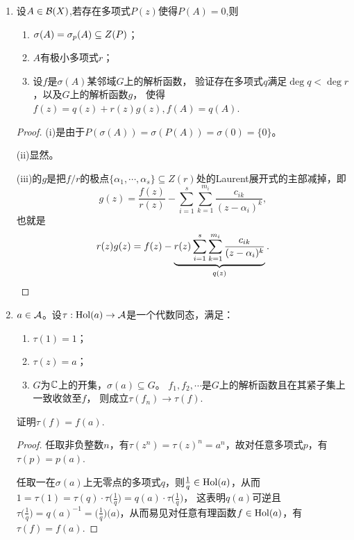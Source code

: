 \begin{enumerate}
\begin{proof}
        (iv)由$f\in\hol(A)$知对任意$1\leqslant i\leqslant m$，有\[f(z)=\sum_{k=0}^\infty \dfrac{f^{(k)}(\lambda_i)}{k!}(z-\lambda_i)^k,\]
        作用在$A$上得\[f(A)=\sum_{k=0}^\infty \dfrac{f^{(k)}(\lambda_i)}{k!}(A-\lambda_i)^k.\] 由于$(A-\lambda_i)^n|_{\Ran(e_i(A))}=0$，故
        \[f(A)e_i(A)=\sum\limits_{k=0}^{n}\dfrac{f^{(k)}(\lambda_{i})}{k!}(A-\lambda_{i})^{k}e_{i}(A),\]再由(ii)中直和分解即得结论.
    \end{proof}
    \item 设$A\in\mathcal{B}(X)$,若存在多项式$P(z)$使得$P(A)=0$,则
        \begin{enumerate}[label=(\roman*)]
            \item $\sigma(A)=\sigma_{p}(A)\subseteq Z(P)$；
            \item $A$有极小多项式$r$；
            \item 设$f$是$\sigma(A)$某邻域$G$上的解析函数，
            验证存在多项式$q$满足$\deg q<\deg r$，以及$G$上的解析函数$g$，
            使得$f(z)=q(z)+r(z)g(z),f(A)=q(A)$.
        \end{enumerate}
    \begin{proof}
        (i)是由于$P(\sigma(A))=\sigma(P(A))=\sigma(0)=\{0\}$。

        (ii)显然。

        (iii)的$g$是把$f/r$的极点$\{\alpha_1,\cdots,\alpha_s\} \subseteq Z(r)$处的Laurent展开式的主部减掉，即
        \[g(z)=\frac{f(z)}{r(z)}-\sum_{i=1}^{s}\sum_{k=1}^{m_i}\frac{c_{ik}}{(z-\alpha_i)^k},\]
        也就是\[r(z)g(z)=f(z)-\underbrace{r(z)\sum_{i=1}^{s}\sum_{k=1}^{m_i}\frac{c_{ik}}{(z-\alpha_i)^k}}_{q(z)}.\qedhere\]
    \end{proof}
    \item $a\in\mathcal{A}$。设$\tau:\mathrm{Hol}(a)\to\mathcal{A}$是一个代数同态，满足：
    \begin{enumerate}[label=(\roman*)]
        \item $\tau(1)=1$； \item $\tau(z)=a$； 
        \item $G$为$\mathbb{C}$上的开集，$\sigma(a)\subseteq G$。
        $f_{1},f_{2},\cdots$是$G$上的解析函数且在其紧子集上一致收敛至$f$，
        则成立$\tau(f_{n})\to\tau(f)$.\end{enumerate} 证明$\tau(f)=f(a)$.
    \begin{proof}
        任取非负整数$n$，有$\tau(z^n)=\tau(z)^n=a^n$，故对任意多项式$p$，有$\tau(p)=p(a)$.

        任取一在$\sigma(a)$上无零点的多项式$q$，则$\frac{1}{q}\in\mathrm{Hol}(a)$，从而$1=\tau(1)=\tau(q)\cdot\tau\big(\frac{1}{q}\big)=q(a)\cdot\tau\big(\frac{1}{q}\big)$，
        这表明$q(a)$可逆且$\tau\big(\frac{1}{q}\big)=q(a)^{-1}=\big(\frac{1}{q})(a\big)$，从而易见对任意有理函数$f\in\mathrm{Hol}(a)$，有$\tau(f)=f(a)$.


\end{proof}
\end{enumerate}
